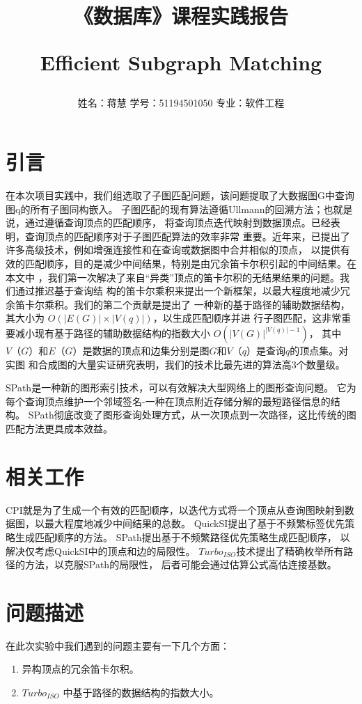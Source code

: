 \documentclass[UTF8]{ctexart}
\begin{document}
	\title{\textbf{《数据库》课程实践报告}\\[1ex]
	\begin{large}
		Efficient Subgraph Matching
	\end{large}}
	\author{姓名：蒋慧\,\,学号：51194501050\,\,专业：软件工程}
	\maketitle

\section{引言}
\par{
在本次项目实践中，我们组选取了子图匹配问题，该问题提取了大数据图G中查询图q的所有子图同构嵌入。
子图匹配的现有算法遵循Ullmann的回溯方法；也就是说，通过遵循查询顶点的匹配顺序，
将查询顶点迭代映射到数据顶点。已经表明，查询顶点的匹配顺序对于子图匹配算法的效率非常
重要。近年来，已提出了许多高级技术，例如增强连接性和在查询或数据图中合并相似的顶点，
以提供有效的匹配顺序，目的是减少中间结果，特别是由冗余笛卡尔积引起的中间结果。在本文中
，我们第一次解决了来自“异类”顶点的笛卡尔积的无结果结果的问题。我们通过推迟基于查询结
构的笛卡尔乘积来提出一个新框架，以最大程度地减少冗余笛卡尔乘积。我们的第二个贡献是提出了
一种新的基于路径的辅助数据结构，其大小为 $O(|E(G)| × |V(q)|)$，以生成匹配顺序并进
行子图匹配，这非常重要减小现有基于路径的辅助数据结构的指数大小 $ O(|V(G)|^{|V(q)|−1})$，
其中$V（G）$和$E（G）$是数据的顶点和边集分别是图$G$和$V（q）$是查询$q$的顶点集。对实图
 和合成图的大量实证研究表明，我们的技术比最先进的算法高3个数量级。
}
\par{SPath是一种新的图形索引技术，可以有效解决大型网络上的图形查询问题。
它为每个查询顶点维护一个邻域签名-一种在顶点附近存储分解的最短路径信息的结构。
SPath彻底改变了图形查询处理方式，从一次顶点到一次路径，这比传统的图匹配方法更具成本效益。
}
\section{相关工作}
\par{
	CPI就是为了生成一个有效的匹配顺序，以迭代方式将一个顶点从查询图映射到数据图，以最大程度地减少中间结果的总数。
	 QuickSI提出了基于不频繁标签优先策略生成匹配顺序的方法。 SPath提出基于不频繁路径优先策略生成匹配顺序，
	 以解决仅考虑QuickSI中的顶点和边的局限性。 $Turbo_{ISO}$技术提出了精确枚举所有路径的方法，以克服SPath的局限性，
	 后者可能会通过估算公式高估连接基数。
}
\section{问题描述}
\par{在此次实验中我们遇到的问题主要有一下几个方面：
}
\begin{enumerate}[(1)]
	\item 异构顶点的冗余笛卡尔积。
	\item $Turbo_{ISO}$ 中基于路径的数据结构的指数大小。

\end{enumerate}
\end{document}
